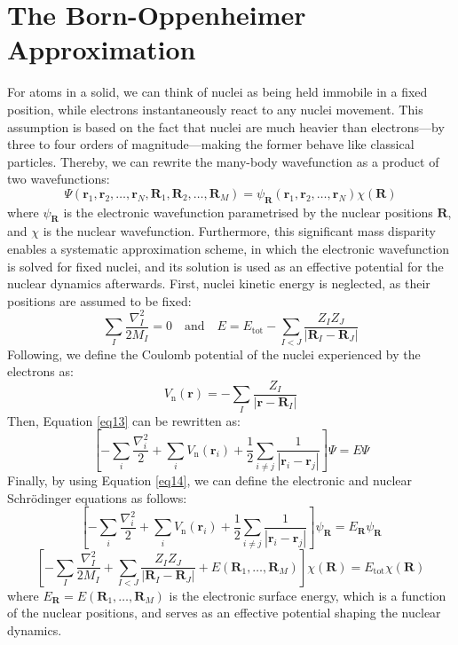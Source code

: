 \section{The Born-Oppenheimer Approximation}
For atoms in a solid, we can think of nuclei as being held immobile in a fixed position, while electrons instantaneously react to any nuclei movement. This assumption is based on the fact that nuclei are much heavier than electrons---by three to four orders of magnitude---making the former behave like classical particles. Thereby, we can rewrite the many-body wavefunction as a product of two wavefunctions:
\begin{equation}
  \Psi(\mathbf{r}_1, \mathbf{r}_2, \ldots, \mathbf{r}_N, \mathbf{R}_1, \mathbf{R}_2, \ldots, \mathbf{R}_M) = \psi_{\mathbf{R}}(\mathbf{r}_1, \mathbf{r}_2, \ldots, \mathbf{r}_N)\chi(\mathbf{R})
  \label{eq14}
\end{equation}
where $\psi_{\mathbf{R}}$ is the electronic wavefunction parametrised by the nuclear positions $\mathbf{R}$, and $\chi$ is the nuclear wavefunction. Furthermore, this significant mass disparity enables a systematic approximation scheme, in which the electronic wavefunction is solved for fixed nuclei, and its solution is used as an effective potential for the nuclear dynamics afterwards. First, nuclei kinetic energy is neglected, as their positions are assumed to be fixed: 
\begin{equation}
  \label{eq15}
  \sum_I \frac{\nabla_I^2}{2 M_I} = 0
  \quad \text{and} \quad  E = E_{\text{tot}} - \sum_{I<J} \frac{Z_I Z_J}{|\mathbf{R}_I - \mathbf{R}_J|}
\end{equation}
Following, we define the Coulomb potential of the nuclei experienced by the electrons as:
\begin{equation}
  \label{eq16}
  V_{\text{n}}(\mathbf{r}) = - \sum_{I} \frac{Z_I}{|\mathbf{r} - \mathbf{R}_I|}
\end{equation}
Then, Equation \ref{eq13} can be rewritten as:
\begin{equation}
  \label{eq17}
  \left[
    -\sum_i \frac{\nabla_i^2}{2} + \sum_i V_{\text{n}}(\mathbf{r}_i) + \frac{1}{2} \sum_{i\neq j} \frac{1}{|\mathbf{r}_i - \mathbf{r}_j|} 
  \right] \Psi = E \Psi 
\end{equation}
Finally, by using Equation \ref{eq14}, we can define the electronic and nuclear Schrödinger equations as follows:
\begin{equation}
  \label{eq18}
  \left[
    -\sum_i \frac{\nabla_i^2}{2} + \sum_i V_{\text{n}}(\mathbf{r}_i) + \frac{1}{2} \sum_{i\neq j} \frac{1}{|\mathbf{r}_i - \mathbf{r}_j|} 
  \right] \psi_{\mathbf{R}} = E_{\mathbf{R}} \psi_{\mathbf{R}}
\end{equation}
\begin{equation}
  \label{eq19}
  \left[
    -\sum_I \frac{\nabla_I^2}{2 M_I} + \sum_{I<J} \frac{Z_I Z_J}{|\mathbf{R}_I - \mathbf{R}_J|} + E(\mathbf{R}_1,\dots,\mathbf{R}_M)\right] \chi(\mathbf{R}) = E_{\text{tot}} \chi(\mathbf{R})
\end{equation}
where $E_{\mathbf{R}}= E(\mathbf{R}_1,\dots,\mathbf{R}_M)$ is the electronic surface energy, which is a function of the nuclear positions, and serves as an effective potential shaping the nuclear dynamics. 

